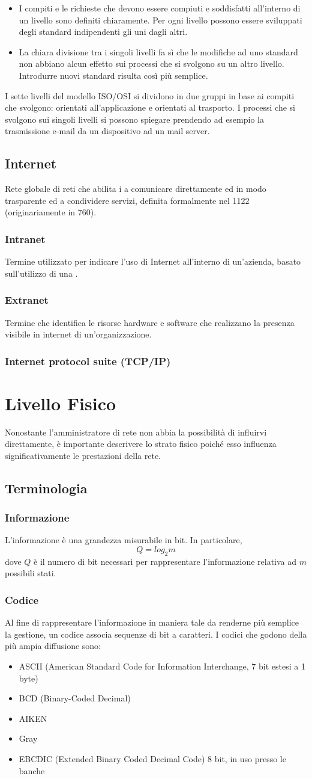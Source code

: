 \documentclass[a4paper,11pt]{article}
\def\sec#1{\section{#1}\label{#1}}
\def\sub#1{\subsection{#1}\label{#1}}
\def\subsub#1{\subsubsection{#1}\label{#1}}
\def\vedi#1{\nameref{#1}}
\begin{document}
\begin{itemize}
	\item I compiti e le richieste che devono essere compiuti e soddisfatti all’interno di un livello sono definiti chiaramente. Per ogni livello possono essere sviluppati degli standard indipendenti gli uni dagli altri.
	\item La chiara divisione tra i singoli livelli fa sì che le modifiche ad uno standard non abbiano alcun effetto sui processi che si svolgono su un altro livello. Introdurre nuovi standard risulta così più semplice.
\end{itemize}
I sette livelli del modello ISO/OSI si dividono in due gruppi in base ai compiti che svolgono: orientati all’applicazione e orientati al trasporto. I processi che si svolgono sui singoli livelli si possono spiegare prendendo ad esempio la trasmissione e-mail da un dispositivo ad un mail server.

\sub{Internet}
Rete globale di reti che abilita i \vedi{DTE} a comunicare direttamente ed in modo trasparente ed a condividere servizi, definita formalmente nel \vedi{RFC} 1122 (originariamente in \vedi{RFC} 760).

\subsub{Intranet}
Termine utilizzato per indicare l'uso di Internet all'interno di un'azienda, basato sull'utilizzo di una \vedi{LAN}.

\subsub{Extranet}
Termine che identifica le risorse hardware e software che realizzano la presenza visibile in internet di un'organizzazione.

\subsub{Internet protocol suite (TCP/IP)}

\newpage

\sec{Livello Fisico}
Nonostante l'amministratore di rete non abbia la possibilità di influirvi direttamente, è importante descrivere lo strato fisico poiché esso influenza significativamente le prestazioni della rete.

\subsection{Terminologia}
\subsub{Informazione} 
L'informazione è una grandezza misurabile in bit. In particolare, \[Q=log_{2}m\] dove $Q$ è il numero di bit necessari per rappresentare l'informazione relativa ad $m$ possibili stati.

\subsub{Codice}
Al fine di rappresentare l'informazione in maniera tale da renderne più semplice la gestione, un codice associa sequenze di bit a caratteri. I codici che godono della più ampia diffusione sono:
\begin{itemize}
\item ASCII (American Standard Code for Information Interchange, 7 bit estesi a 1 byte)
\item BCD (Binary-Coded Decimal)
\item AIKEN 
\item Gray
\item EBCDIC (Extended Binary Coded Decimal Code) 8 bit, in uso presso le banche
\end{itemize}
\end{document}

